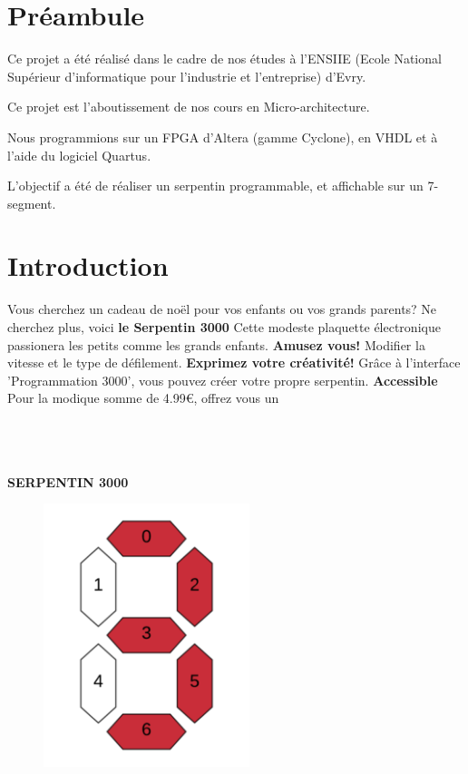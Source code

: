 \documentclass[10pt]{article}
\begin{document}
    \tableofcontents
    \section*{Préambule}
    Ce projet a été réalisé dans le cadre de nos études à l'ENSIIE (Ecole National Supérieur d'informatique pour l'industrie et l'entreprise) d'Evry.
    
    Ce projet est l'aboutissement de nos cours en Micro-architecture.
    
    Nous programmions sur un FPGA d'Altera (gamme Cyclone), en VHDL et à l'aide du logiciel Quartus.
    
    L'objectif a été de réaliser un serpentin programmable, et affichable sur un 7-segment.

    \newpage
    \section{Introduction}
    Vous cherchez un cadeau de noël pour vos enfants ou vos grands parents?
    \newline
    Ne cherchez plus, voici \textbf{le Serpentin 3000}
    \newline
    Cette modeste plaquette électronique passionera les petits comme les grands enfants.
    \newline
    \newline
    \textbf{Amusez vous!}
    \newline
    Modifier la vitesse et le type de défilement.
    \newline
    \newline
    \textbf{Exprimez votre créativité!}
    \newline
    Grâce à l'interface 'Programmation 3000', vous pouvez créer votre propre serpentin.
    \newline
    \newline
    \textbf{Accessible}
    Pour la modique somme de 4.99\euro, offrez vous un\\
    \\
    \\
    \\
    \centerline{\textbf{SERPENTIN 3000}}
    \newline
    \newline
    \begin{figure}[h!]
        \includegraphics[width=6cm]{logo.png}
    \end{figure}
\end{document}
